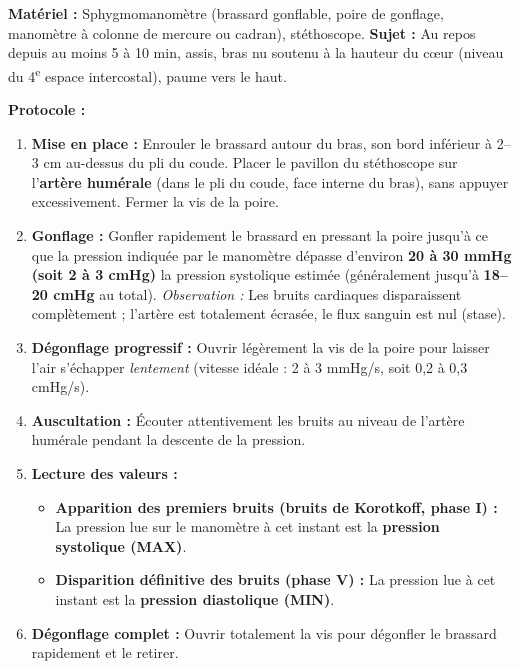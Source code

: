 \documentclass[11pt]{article}
\begin{document}
\begin{experience}
\textbf{Matériel :} Sphygmomanomètre (brassard gonflable, poire de gonflage, manomètre à colonne de mercure ou cadran), stéthoscope.
\textbf{Sujet :} Au repos depuis au moins 5 à 10 min, assis, bras nu soutenu à la hauteur du cœur (niveau du 4\textsuperscript{e} espace intercostal), paume vers le haut.

\textbf{Protocole :}
\begin{enumerate}
    \item \textbf{Mise en place :} Enrouler le brassard autour du bras, son bord inférieur à 2--3 cm au-dessus du pli du coude. Placer le pavillon du stéthoscope sur l'\textbf{artère humérale} (dans le pli du coude, face interne du bras), sans appuyer excessivement. Fermer la vis de la poire.
    \item \textbf{Gonflage :} Gonfler rapidement le brassard en pressant la poire jusqu'à ce que la pression indiquée par le manomètre dépasse d'environ \textbf{20 à 30 mmHg (soit 2 à 3 cmHg)} la pression systolique estimée (généralement jusqu'à \textbf{18--20 cmHg} au total). \emph{Observation :} Les bruits cardiaques disparaissent complètement ; l'artère est totalement écrasée, le flux sanguin est nul (stase).
    \item \textbf{Dégonflage progressif :} Ouvrir légèrement la vis de la poire pour laisser l'air s'échapper \emph{lentement} (vitesse idéale : 2 à 3 mmHg/s, soit 0,2 à 0,3 cmHg/s).
    \item \textbf{Auscultation :} Écouter attentivement les bruits au niveau de l'artère humérale pendant la descente de la pression.
    \item \textbf{Lecture des valeurs :}
    \begin{itemize}
        \item \textbf{Apparition des premiers bruits (bruits de Korotkoff, phase I) :} La pression lue sur le manomètre à cet instant est la \textbf{pression systolique (MAX)}.
        \item \textbf{Disparition définitive des bruits (phase V) :} La pression lue à cet instant est la \textbf{pression diastolique (MIN)}.
    \end{itemize}
    \item \textbf{Dégonflage complet :} Ouvrir totalement la vis pour dégonfler le brassard rapidement et le retirer.
\end{enumerate}


\end{experience}
\end{document}

